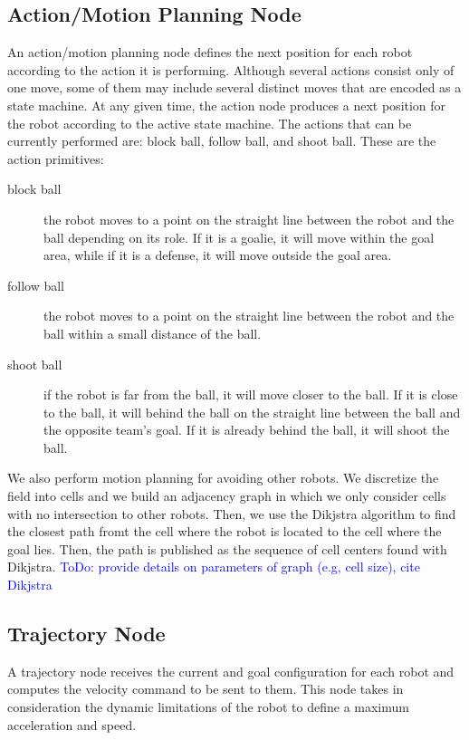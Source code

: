 \documentclass[]{llncs}
\newcommand{\TODO}[1]{{\textcolor{blue}{ToDo: {#1}}}}
\begin{document}
\subsection{Action/Motion Planning Node}
An action/motion planning node defines the next position for each robot according to the action it is performing. Although several actions consist only of one move, some of them may include several distinct moves that are encoded as a state machine. At any given time, the action node produces a next position for the robot according to the active state machine. The actions that can be currently performed are: block ball, follow ball, and shoot ball. These are the action primitives:

\begin{description}
	\item[block ball] the robot moves to a point on the straight line between the robot and the ball depending on its role. If it is a goalie, it will move within the goal area, while if it is a defense, it will move outside the goal area.
	\item[follow ball] the robot moves to a point on the straight line between the robot and the ball within a small distance of the ball.
	\item[shoot ball] if the robot is far from the ball, it will move closer to the ball. If it is close to the ball, it will behind the ball on the straight line between the ball and the opposite team's goal. If it is already behind the ball, it will shoot the ball.
\end{description}

We also perform motion planning for avoiding other robots. We discretize the field into cells and we build an adjacency graph in which we only consider cells with no intersection to other robots. Then, we use the Dikjstra algorithm to find the closest path fromt the cell where the robot is located to the cell where the goal lies. Then, the path is published as the sequence of cell centers found with Dikjstra.
\TODO{provide details on parameters of graph (e.g, cell size), cite Dikjstra}

 
\subsection{Trajectory Node}
A trajectory node receives the current and goal configuration for each robot and computes the velocity command to be sent to them. This node takes in consideration the dynamic limitations of the robot to define a maximum acceleration and speed. 
\end{document}
